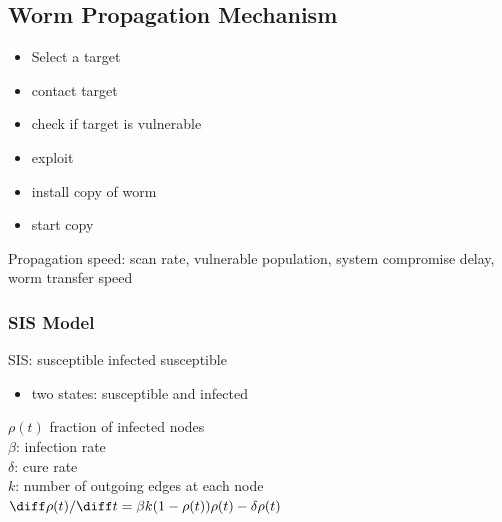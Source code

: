 \documentclass[fs, footer]{latex4ei}
\begin{document}
\begin{multicols*}{4}
{      \subsection{Worm Propagation Mechanism}
      \begin{itemize}
       	\item Select a target
       	\item contact target
       	\item check if target is vulnerable
       	\item exploit
       	\item install copy of worm
       	\item start copy
       \end{itemize} 

       Propagation speed: scan rate, vulnerable population, system compromise delay, worm transfer speed


       \subsubsection{SIS Model}
       SIS: susceptible infected susceptible
       \begin{itemize}
        	\item two states: susceptible and infected
        \end{itemize} 

        $\rho (t)$ fraction of infected nodes \\
        $\beta$: infection rate \\
        $\delta$: cure rate\\
        $k$: number of outgoing edges at each node\\ 
        $\diff \rho (t) / \diff t = \beta k (1 - \rho (t)) \rho (t)  - \delta \rho (t)$\\
}  \sectionbox{
}
\end{multicols*}
\end{document}
